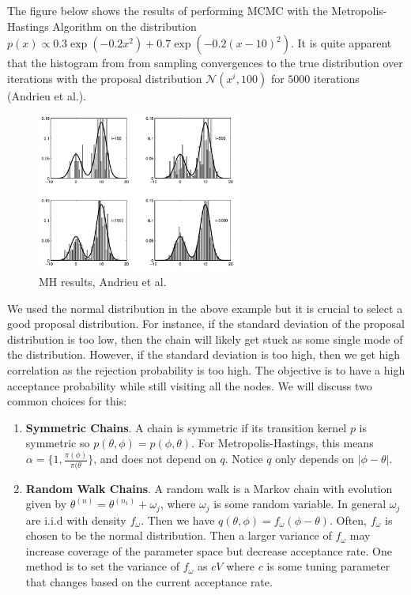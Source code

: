 \documentclass[paper=a4, fontsize=12pt]{scrartcl} %
\numberwithin{equation}{section} %
\numberwithin{figure}{section} %
\numberwithin{table}{section} %
\begin{document}
The figure below shows the results of performing MCMC with the Metropolis-Hastings Algorithm on the distribution $p(x) \propto 0.3\exp(-0.2x^2)+0.7\exp(-0.2(x-10)^2)$. It is quite apparent that the histogram from from sampling convergences to the true distribution over iterations
with the proposal distribution $\mathcal{N}(x^i, 100)$ for $5000$ iterations (Andrieu et al.).
\begin{figure}[H]
    \centering
    \includegraphics[width=0.6\textwidth]{images/metropolis}
    \caption{MH results, Andrieu et al.}
\end{figure}

We used the normal distribution in the above example but it is crucial to select a good proposal 
distribution. For instance, if the standard deviation of the proposal 
distribution is too low, then the chain will likely get stuck as some single mode 
of the distribution. However, if the standard deviation is too high, then 
we get high correlation as the rejection probability is too high. The objective is 
to have a high acceptance probability while still visiting all the nodes. We will discuss two 
common choices for this:
\begin{enumerate}
    \item \textbf{Symmetric Chains}. A chain is symmetric if its transition kernel $p$ is symmetric 
    so $p(\theta, \phi) = p(\phi, \theta)$. For Metropolis-Hastings, this means $\alpha = \{1, \frac{\pi(\phi)}{\pi(\theta}\}$, and 
    does not depend on $q$. Notice $q$ only depends on $| \phi - \theta|$.

    \item \textbf{Random Walk Chains}. A random walk is a Markov chain with evolution given 
    by $\theta^{(n)} = \theta^{(n_1)} + \omega_j$, where $\omega_j$ is  some random variable. 
    In general $\omega_j$ are i.i.d with density $f_\omega$. Then we have $q(\theta, \phi) = f_\omega(\phi - \theta)$. 
    Often, $f_\omega$ is chosen to be the normal distribution. Then a larger variance of $f_\omega$ may 
    increase coverage of the parameter space but decrease acceptance rate. One method is to 
    set the variance of $f_\omega$ as $cV$ where $c$ is some tuning parameter that changes based 
    on the current acceptance rate.
\end{enumerate}
\end{document}
